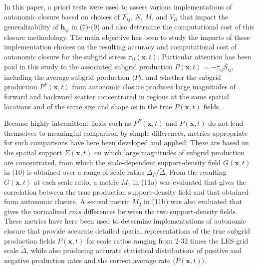 In this paper, a priori tests were used to assess various implementations of autonomic closure based on choices of $F_{ij}$, $N$, $M$, and  $V_B$ that impact the generalizability of $\mathbf{h}_{ij}$  in (7)-(9) and also determine the computational cost of this closure methodology. The main objective has been to study the impacts of these implementation choices on the resulting accuracy and computational cost of autonomic closure for the subgrid stress $\tau_{ij}(\mathbf{x},t)$. Particular attention has been paid in this study to the associated subgrid production $P(\mathbf{x},t) = -\tau_{ij}\widetilde{S_{ij}}$, including the average subgrid production $\langle P \rangle$, and whether the subgrid production $P^{F}(\mathbf{x},t)$  from autonomic closure produces large magnitudes of forward and backward scatter concentrated in regions at the same spatial locations and of the same size and shape as in the true  $P(\mathbf{x},t)$  fields.  

Because highly intermittent fields such as $P^{F}(\mathbf{x},t)$ and $P(\mathbf{x},t)$  do not lend themselves to meaningful comparison by simple differences, metrics appropriate for such comparisons have here been developed and applied. These are based on the spatial support $\Sigma(\mathbf{x},t)$  on which large magnitudes of subgrid production are concentrated, from which the scale-dependent support-density field $G(\mathbf{x},t)$ in (10) is obtained over a range of scale ratios $\Delta_{\Gamma}/\widetilde{\Delta}$. From the resulting $G(\mathbf{x},t)$ at each scale ratio, a metric $M_1$  in (11a) was evaluated that gives the correlation between the true production support-density field and that obtained from autonomic closure. A second metric $M_2$  in (11b) was also evaluated that gives the normalized $rms$ differences between the two support-density fields. These metrics have here been used to determine implementations of autonomic closure that provide accurate detailed spatial representations of the true subgrid production fields $P(\mathbf{x},t)$  for scale ratios ranging from 2-32 times the LES grid scale $\widetilde{\Delta}$, while also producing accurate statistical distributions of positive and negative production rates and the correct average rate $\langle P(\mathbf{x},t) \rangle$.

